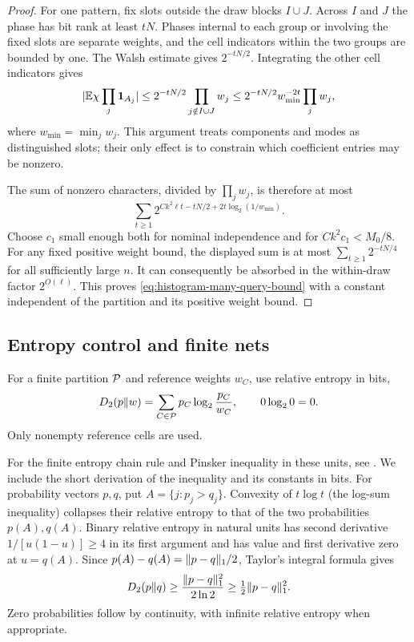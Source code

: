 \begin{proof}
For one pattern, fix slots outside the draw blocks $I\cup J$. Across
$I$ and $J$ the phase has bit rank at least $tN$. Phases internal to
each group or involving the fixed slots are separate weights, and the
cell indicators within the two groups are bounded by one. The Walsh
estimate gives $2^{-tN/2}$. Integrating the other cell indicators gives
\begin{equation}\label{eq:histogram-character-bound}
 \lvert \mathbb E\chi\prod_j\mathbf 1_{A_j}\rvert
 \le 2^{-tN/2}\prod_{j\notin I\cup J}w_j
 \le 2^{-tN/2}w_{\min}^{-2t}\prod_jw_j,
\end{equation}
where $w_{\min}=\min_jw_j$. This argument treats components and modes
as distinguished slots; their only effect is to constrain which
coefficient entries may be nonzero.

The sum of nonzero characters, divided by $\prod_jw_j$, is therefore
at most
\[
 \sum_{t\ge1}
 2^{Ck^2\ell t-tN/2+2t\log_2(1/w_{\min})}.
\]
Choose $c_1$ small enough both for nominal independence and for
$Ck^2c_1<M_0/8$. For any fixed positive weight bound, the displayed sum
is at most $\sum_{t\ge1}2^{-tN/4}$ for all sufficiently large $n$.
It can consequently be absorbed in the within-draw factor
$2^{O(\ell)}$. This proves \eqref{eq:histogram-many-query-bound} with a
constant independent of the partition and its positive weight bound.
\end{proof}

\subsection{Entropy control and finite nets}

For a finite partition $\mathcal P$ and reference weights $w_C$, use relative
entropy in bits,
\[
 D_2(p\Vert w)=\sum_{C\in\mathcal P}p_C\log_2\frac{p_C}{w_C},
 \qquad 0\log_2 0=0.
\]
Only nonempty reference cells are used.

For the finite entropy chain rule and Pinsker inequality in these units,
see \citet[Theorem~2.5.3 and Lemma~11.6.1]{cover2006}. We include the
short derivation of the inequality and its constants in bits.
For probability vectors $p,q$, put $A=\{j:p_j>q_j\}$. Convexity of
$t\log t$ (the log-sum inequality) collapses their relative entropy
to that of the two probabilities $p(A),q(A)$. Binary relative entropy
in natural units has second derivative $1/[u(1-u)]\ge4$ in its first
argument and has value and first derivative zero at $u=q(A)$.
Since $p(A)-q(A)=\lVert p-q\rVert_1/2$, Taylor's integral formula gives
\begin{equation}\label{eq:histogram-pinsker}
 D_2(p\Vert q)\ge \frac{\lVert p-q\rVert_1^2}{2\ln2}
 \ge\tfrac12\lVert p-q\rVert_1^2.
\end{equation}
Zero probabilities follow by continuity, with infinite relative entropy
when appropriate.

